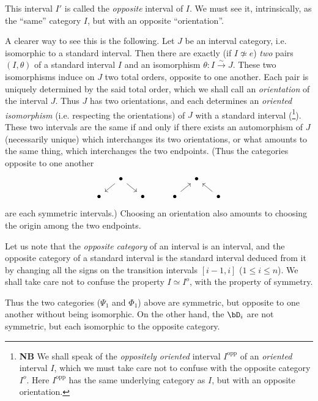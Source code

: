This interval $I'$ is called the \textit{opposite} interval of $I$. We must see it, intrinsically, as the ``same'' category $I$, %
but with an opposite ``orientation''.


A clearer way to see this is the following. Let $J$ be an interval category, i.e. isomorphic to a standard interval. Then there are exactly (if $I \not\simeq e$) \textit{two} pairs $(I,\theta)$ of a standard interval $I$ and an isomorphism $\theta : I \xrightarrow{\sim} J$. These two isomorphisms induce on $J$ two total orders, opposite to one another. Each pair is uniquely determined by the said total order, which we shall call %
an \textit{orientation} of the interval $J$. Thus $J$ has two orientations, and each determines an \textit{oriented isomorphism} (i.e. respecting
the orientations) of $J$ with a standard interval (\footnote[2]{\textbf{NB} We shall speak of the \textit{oppositely oriented} interval $I^{\mathrm{opp}}$ of an \textit{oriented} interval $I$, which we must take care not to confuse with the opposite category $I^o$. Here $I^{\mathrm{opp}}$ has the same underlying category as $I$, but with an opposite orientation.}). These two intervals are the same if and only if there exists an automorphism of $J$ (necessarily unique) which interchanges its two orientations, or what amounts to the same thing, which interchanges the two endpoints. (Thus the categories opposite to one another
\[
\begin{tikzcd}[column sep=small, row sep=small]
 & \bullet \arrow[dl] \arrow[dr] & & & & \bullet & \\
 \bullet & & \bullet & & \bullet \arrow[ur] & & \bullet \arrow[ul]
\end{tikzcd}
\]
are each %
symmetric intervals.) Choosing an orientation also amounts to %
choosing the origin among the two endpoints.

Let us note that the \textit{opposite category} of an interval is an interval, and the opposite category of a standard interval is the standard interval deduced from it by changing all the signs on the transition intervals $[i-1,i]$ ($1 \leq i \leq n$). We shall take care not to confuse the property $I \simeq I^o$, with the property of symmetry.


Thus the two categories ($\Psi_1$ and $\Phi_1$) above are symmetric, but opposite to one another without being isomorphic. On the other hand, the $\bD_i$ are not symmetric, but each isomorphic to the opposite category.

